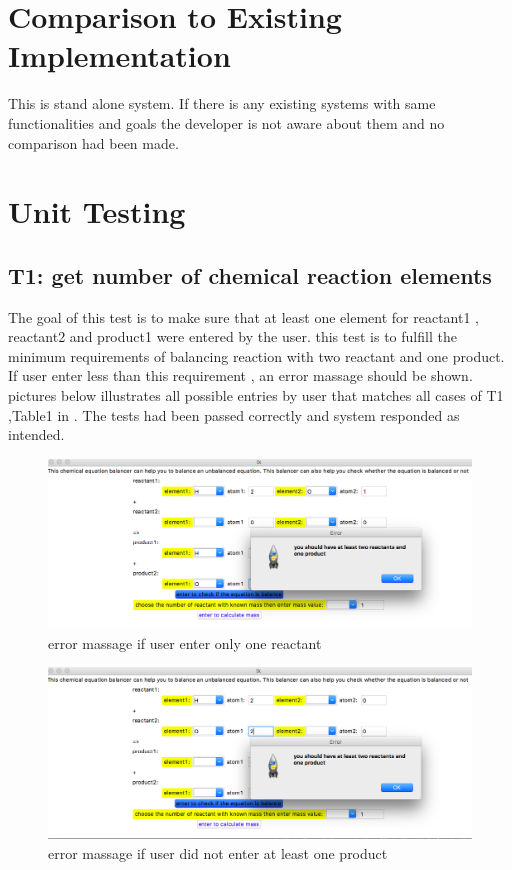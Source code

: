 \documentclass[12pt, titlepage]{article}
\begin{document}
\section{Comparison to Existing Implementation}	

This is stand alone system. If there is any existing systems with same functionalities and goals the developer is not aware about them and no comparison had  been made. 

\section{Unit Testing}\label{unit}

\subsection{T1: get number of chemical reaction elements}

The goal of this test is to make sure that at least one element for reactant1 , reactant2 and product1 were entered by the user. this test is to fulfill the minimum requirements of balancing reaction with two reactant and one product. If user enter less than this requirement , an error massage should be shown. pictures below illustrates all possible entries by user that matches all cases of T1 ,Table1 in \cite{UnitVnVPlan}. The tests had been passed correctly and system responded as intended. 

\begin{figure}[h!]
 \begin{center}
 \includegraphics [width=\textwidth]{ElementNumber1}
 \caption{\label{ Figure 1:} error massage if user enter only one reactant}
 \end{center}
 \end{figure}
 
 \begin{figure}[h!]
 \begin{center}
 \includegraphics [width=\textwidth]{ElementNumber2}
 \caption{\label{ Figure 2:} error massage if user did not enter at least one product}
 \end{center}
 \end{figure}
 
\end{document}
